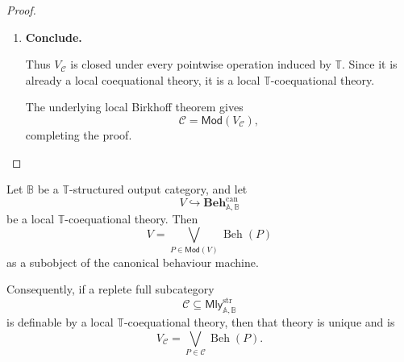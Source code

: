 \begin{proof}
\begin{enumerate}
        Let
        \[
            \theta:0\to1
        \]
        be a nullary operation, interpreted as an internal functor
        \[
            \theta:1\to\mathbb B.
        \]
        Closure of \(\mathcal C\) under this nullary operation gives
        \[
            \theta()\in\mathcal C.
        \]
        Therefore
        \[
            \theta()\models V_{\mathcal C}.
        \]
        Its semantic map admits a unique strict model factorization
        \[
            \theta_{V_{\mathcal C}}:
            A_0\longrightarrow V_{\mathcal C}
        \]
        satisfying
        \[
            j_{V_{\mathcal C}}\theta_{V_{\mathcal C}}
            =
            \beta_{\theta()}.
        \]

        By the nullary case of
        Lemma~\ref{lem:structured-operations-semantic}, the semantic map of
        \(\theta()\) is the constant residual-behaviour map
        \[
            \theta_{\mathbf{Beh}}:
            A_0\to\mathbf{Beh}_0.
        \]
        Hence
        \[
            j_{V_{\mathcal C}}\theta_{V_{\mathcal C}}
            =
            \theta_{\mathbf{Beh}}.
        \]
        This is precisely the required nullary closure factorization.

        \item \textbf{Conclude.}

        Thus \(V_{\mathcal C}\) is closed under every pointwise operation
        induced by \(\mathbb T\). Since it is already a local coequational
        theory, it is a local \(\mathbb T\)-coequational theory.

        The underlying local Birkhoff theorem gives
        \[
            \mathcal C
            =
            \mathsf{Mod}(V_{\mathcal C}),
        \]
        completing the proof.
    \end{enumerate}
\end{proof}

\begin{corollary}
\label{cor:uniqueness-defining-local-T-coequational-theory}
    Let \(\mathbb B\) be a \(\mathbb T\)-structured output category, and let
    \[
        V\hookrightarrow
        \mathbf{Beh}^{\mathrm{can}}_{\mathbb A,\mathbb B}
    \]
    be a local \(\mathbb T\)-coequational theory. Then
    \[
        V
        =
        \bigvee_{P\in\mathsf{Mod}(V)}
        \operatorname{Beh}(P)
    \]
    as a subobject of the canonical behaviour machine.

    Consequently, if a replete full subcategory
    \[
        \mathcal C
        \subseteq
        \mathsf{Mly}^{\mathrm{str}}_{\mathbb A,\mathbb B}
    \]
    is definable by a local \(\mathbb T\)-coequational theory, then that theory
    is unique and is
    \[
        V_{\mathcal C}
        =
        \bigvee_{P\in\mathcal C}
        \operatorname{Beh}(P).
    \]
\end{corollary}


